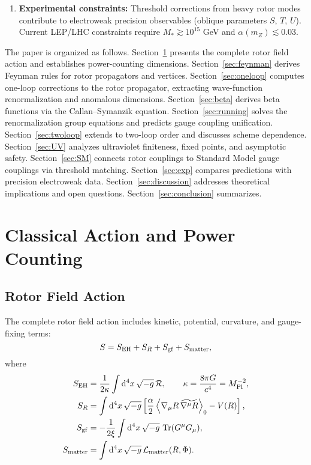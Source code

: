 \documentclass[11pt,a4paper]{article}
\numberwithin{equation}{section}
\theoremstyle{plain}
\theoremstyle{definition}
\theoremstyle{remark}
\DeclareMathOperator{\Tr}{Tr}
\newcommand{\dd}{\mathrm{d}}
\newcommand{\rev}[1]{\widetilde{#1}}        %
\newcommand{\grade}[2]{\left\langle #1 \right\rangle_{#2}}
\newcommand{\Lag}{\mathcal{L}}              %
\begin{document}
\begin{enumerate}[leftmargin=*,itemsep=3pt]
  \item \textbf{Experimental constraints:} Threshold corrections from heavy rotor modes contribute to electroweak precision observables (oblique parameters $S$, $T$, $U$). Current LEP/LHC constraints require $M_* \gtrsim 10^{15}$ GeV and $\alpha(m_Z)\lesssim 0.03$.
\end{enumerate}

The paper is organized as follows. Section~\ref{sec:action} presents the complete rotor field action and establishes power-counting dimensions. Section~\ref{sec:feynman} derives Feynman rules for rotor propagators and vertices. Section~\ref{sec:oneloop} computes one-loop corrections to the rotor propagator, extracting wave-function renormalization and anomalous dimensions. Section~\ref{sec:beta} derives beta functions via the Callan--Symanzik equation. Section~\ref{sec:running} solves the renormalization group equations and predicts gauge coupling unification. Section~\ref{sec:twoloop} extends to two-loop order and discusses scheme dependence. Section~\ref{sec:UV} analyzes ultraviolet finiteness, fixed points, and asymptotic safety. Section~\ref{sec:SM} connects rotor couplings to Standard Model gauge couplings via threshold matching. Section~\ref{sec:exp} compares predictions with precision electroweak data. Section~\ref{sec:discussion} addresses theoretical implications and open questions. Section~\ref{sec:conclusion} summarizes.

\vspace{1em}

\section{Classical Action and Power Counting}\label{sec:action}

\subsection{Rotor Field Action}

The complete rotor field action includes kinetic, potential, curvature, and gauge-fixing terms:
\begin{equation}
S = S_{\rm EH} + S_R + S_{\rm gf} + S_{\rm matter},
\label{eq:action-total}
\end{equation}
where
\begin{align}
S_{\rm EH} &= \frac{1}{2\kappa}\int \dd^4x\,\sqrt{-g}\,\mathcal{R}, \qquad \kappa=\frac{8\pi G}{c^4}=M_{\rm Pl}^{-2}, \label{eq:S-EH}\\
S_R &= \int \dd^4x\,\sqrt{-g}\left[\frac{\alpha}{2}\grade{\nabla_\mu R\,\rev{\nabla^\mu R}}{0} - V(R)\right], \label{eq:S-rotor}\\
S_{\rm gf} &= -\frac{1}{2\xi}\int \dd^4x\,\sqrt{-g}\,\Tr(G^\mu G_\mu), \label{eq:S-gf}\\
S_{\rm matter} &= \int \dd^4x\,\sqrt{-g}\,\Lag_{\rm matter}(R,\Phi). \label{eq:S-matter}
\end{align}
\end{document}

